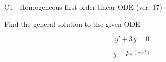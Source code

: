 \begin{exercise}
  \begin{exerciseTitle}C1 - Homogeneous first-order linear ODE (ver. 17)\end{exerciseTitle}
  \begin{exerciseStatement}
    
Find the general solution to the given ODE.

    
\[y'+3y=0\]

  \end{exerciseStatement}
  \begin{exerciseAnswer}
    
\[y= k e^{\left(-3 \, t\right)}\]

  \end{exerciseAnswer}
\end{exercise}